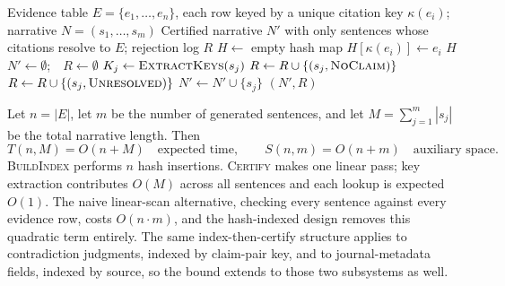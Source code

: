 \documentclass[12pt,a4paper]{report}
\begin{document}
\begin{algorithm}[H]
\caption{\textsc{VoRG-Certify}: linear-time verify-or-reject narrative certification}
\label{alg:certify}
\begin{algorithmic}[1]
\Require Evidence table $E=\{e_1,\dots,e_n\}$, each row keyed by a unique citation key $\kappa(e_i)$; narrative $N=(s_1,\dots,s_m)$
\Ensure Certified narrative $N'$ with only sentences whose citations resolve to $E$; rejection log $R$
  \State $H \gets$ empty hash map
   \State $H[\kappa(e_i)] \gets e_i$  \EndFor
  \State \Return $H$
\EndFunction
{}
  \State $N' \gets \emptyset$;\ \ $R \gets \emptyset$
   
    \State $K_j \gets \Call{ExtractKeys}{s_j}$ 
     \State $R \gets R \cup \{(s_j, \textsc{NoClaim})\}$
     \State $R \gets R \cup \{(s_j, \textsc{Unresolved})\}$ 
    \Else \State $N' \gets N' \cup \{s_j\}$
    \EndIf
  \EndFor
  \State \Return $(N', R)$
\EndFunction
\end{algorithmic}
\end{algorithm}

Let $n=|E|$, let $m$ be the number of generated sentences, and let
$M=\sum_{j=1}^{m}|s_j|$ be the total narrative length. Then
\[
T(n,M) = O(n + M) \quad \text{expected time}, \qquad S(n,m) = O(n + m) \quad \text{auxiliary space}.
\]
\textsc{BuildIndex} performs $n$ hash insertions. \textsc{Certify} makes one
linear pass; key extraction contributes $O(M)$ across all sentences and each
lookup is expected $O(1)$. The naive linear-scan alternative, checking every
sentence against every evidence row, costs $O(n \cdot m)$, and the
hash-indexed design removes this quadratic term entirely. The same
index-then-certify structure applies to contradiction judgments, indexed by
claim-pair key, and to journal-metadata fields, indexed by source, so the
bound extends to those two subsystems as well.
\end{document}
